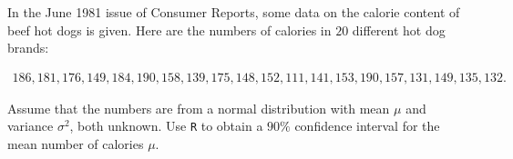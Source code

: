 
\begin{exercise}

In the June 1981 issue of Consumer Reports, some data on the calorie content of beef hot dogs is given.
Here are the numbers of calories in $20$ different hot dog brands:

\begin{align*}
    186, 181, 176, 149, 184, 190, 158, 139, 175, 148, 152, 111, 141, 153, 190, 157, 131, 149, 135, 132.
\end{align*}

Assume that the numbers are from a normal distribution with mean $\mu$ and variance $\sigma^2$, both unknown.
Use \texttt R to obtain a $90 \%$ confidence interval for the mean number of calories $\mu$.

\end{exercise}


\begin{solution}

\phantom{}

\end{solution}

